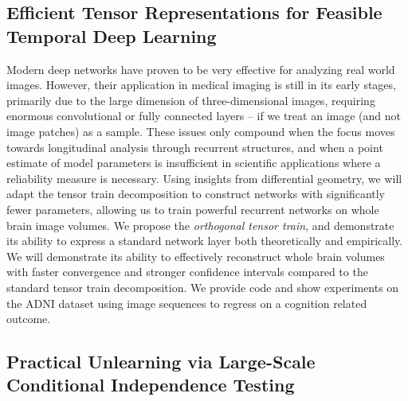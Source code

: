 \subsection{Efficient Tensor Representations for Feasible Temporal Deep Learning}

Modern deep networks have proven to be very effective for analyzing real world images.
However, their application in medical imaging is still in its early stages,
primarily due to the large dimension of three-dimensional images, requiring enormous convolutional or fully connected layers --
if we treat an image (and not image patches) as a sample. 
These issues only compound when the focus moves towards longitudinal analysis
through recurrent structures, and when a point estimate of model parameters is insufficient 
in scientific applications where a reliability measure is necessary.
Using insights from differential geometry, 
we will adapt 
the tensor train decomposition to construct networks
with significantly fewer parameters,
allowing us to train powerful recurrent networks on whole brain image volumes. 
We propose 
the \textit{orthogonal tensor train},
and demonstrate its ability to express a standard network layer both theoretically and empirically.
We will 
demonstrate its ability to 
effectively reconstruct whole brain volumes
with faster convergence and stronger confidence intervals
compared to the standard tensor train decomposition. 
We provide code and show experiments on the ADNI dataset
using image sequences to regress on a cognition related outcome.


\subsection{Practical Unlearning via Large-Scale Conditional Independence Testing}

